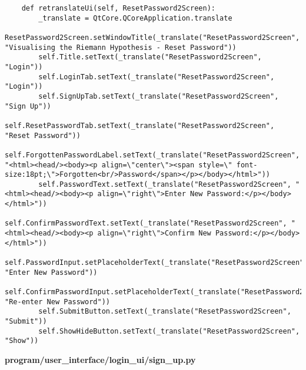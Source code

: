\documentclass{article}
\begin{document}
\begin{lstlisting}
    def retranslateUi(self, ResetPassword2Screen):
        _translate = QtCore.QCoreApplication.translate
        ResetPassword2Screen.setWindowTitle(_translate("ResetPassword2Screen", "Visualising the Riemann Hypothesis - Reset Password"))
        self.Title.setText(_translate("ResetPassword2Screen", "Login"))
        self.LoginTab.setText(_translate("ResetPassword2Screen", "Login"))
        self.SignUpTab.setText(_translate("ResetPassword2Screen", "Sign Up"))
        self.ResetPasswordTab.setText(_translate("ResetPassword2Screen", "Reset Password"))
        self.ForgottenPasswordLabel.setText(_translate("ResetPassword2Screen", "<html><head/><body><p align=\"center\"><span style=\" font-size:18pt;\">Forgotten<br/>Password</span></p></body></html>"))
        self.PasswordText.setText(_translate("ResetPassword2Screen", "<html><head/><body><p align=\"right\">Enter New Password:</p></body></html>"))
        self.ConfirmPasswordText.setText(_translate("ResetPassword2Screen", "<html><head/><body><p align=\"right\">Confirm New Password:</p></body></html>"))
        self.PasswordInput.setPlaceholderText(_translate("ResetPassword2Screen", "Enter New Password"))
        self.ConfirmPasswordInput.setPlaceholderText(_translate("ResetPassword2Screen", "Re-enter New Password"))
        self.SubmitButton.setText(_translate("ResetPassword2Screen", "Submit"))
        self.ShowHideButton.setText(_translate("ResetPassword2Screen", "Show"))
\end{lstlisting}


\textbf{program/user\_interface/login\_ui/sign\_up.py}
\end{document}
